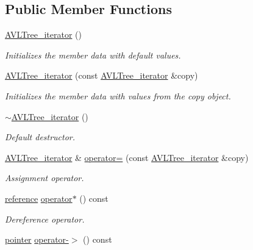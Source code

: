 \subsection*{Public Member Functions}
\begin{DoxyCompactItemize}
\item 
\hyperlink{class_a_v_l_tree__iterator_af2b909a226f39060ee9b27159329891c}{A\+V\+L\+Tree\+\_\+iterator} ()
\begin{DoxyCompactList}\small\item\em Initializes the member data with default values. \end{DoxyCompactList}\item 
\hyperlink{class_a_v_l_tree__iterator_a0e2b50ac09524402305b57cf6d70a403}{A\+V\+L\+Tree\+\_\+iterator} (const \hyperlink{class_a_v_l_tree__iterator}{A\+V\+L\+Tree\+\_\+iterator} \&copy)
\begin{DoxyCompactList}\small\item\em Initializes the member data with values from the copy object. \end{DoxyCompactList}\item 
\hyperlink{class_a_v_l_tree__iterator_a126eb53123eb440dd96fe2738b82cbc3}{$\sim$\+A\+V\+L\+Tree\+\_\+iterator} ()
\begin{DoxyCompactList}\small\item\em Default destructor. \end{DoxyCompactList}\item 
\hyperlink{class_a_v_l_tree__iterator}{A\+V\+L\+Tree\+\_\+iterator} \& \hyperlink{class_a_v_l_tree__iterator_a0ed09a6668db4965df05ce76d1afd58b}{operator=} (const \hyperlink{class_a_v_l_tree__iterator}{A\+V\+L\+Tree\+\_\+iterator} \&copy)
\begin{DoxyCompactList}\small\item\em Assignment operator. \end{DoxyCompactList}\item 
\hyperlink{class_a_v_l_tree__iterator_a67cbb11da40a9e4a517bb9a082590d5a}{reference} \hyperlink{class_a_v_l_tree__iterator_a9aee606e4ff5c9500190256e78793200}{operator$\ast$} () const 
\begin{DoxyCompactList}\small\item\em Dereference operator. \end{DoxyCompactList}\item 
\hyperlink{class_a_v_l_tree__iterator_ab3060d2f8d96febec03250b59b9d6c5b}{pointer} \hyperlink{class_a_v_l_tree__iterator_a7a15816e2b2a6e4bf6242477391f5cc5}{operator-\/$>$} () const 

\end{DoxyCompactItemize}
